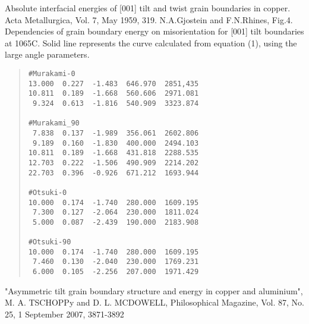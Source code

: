 \documentclass[12pt,a4paper]{jsarticle}
\begin{document}
Absolute interfacial energies of [001] tilt and twist grain boundaries in copper.
Acta Metallurgica, Vol. 7, May 1959, 319.
N.A.Gjostein and F.N.Rhines, 
Fig.4. Dependencies of grain boundary energy on misorientation for [001] tilt boundaries at 1065C.  Solid line represents the curve calculated from equation (1), using the large angle parameters.
\begin{quote}\begin{verbatim}
#Murakami-0
13.000  0.227  -1.483  646.970  2851,435
10.811  0.189  -1.668  560.606  2971.081
 9.324  0.613  -1.816  540.909  3323.874

#Murakami_90
 7.838  0.137  -1.989  356.061  2602.806
 9.189  0.160  -1.830  400.000  2494.103
10.811  0.189  -1.668  431.818  2288.535
12.703  0.222  -1.506  490.909  2214.202
22.703  0.396  -0.926  671.212  1693.944

#Otsuki-0
10.000  0.174  -1.740  280.000  1609.195
 7.300  0.127  -2.064  230.000  1811.024
 5.000  0.087  -2.439  190.000  2183.908

#Otsuki-90
10.000  0.174  -1.740  280.000  1609.195
 7.460  0.130  -2.040  230.000  1769.231
 6.000  0.105  -2.256  207.000  1971.429
\end{verbatim}\end{quote}
"Asymmetric tilt grain boundary structure and energy in copper and aluminium",
M. A. TSCHOPPy and D. L. MCDOWELL, Philosophical Magazine, Vol. 87, No. 25, 1 September 2007, 3871-3892
\end{document}
